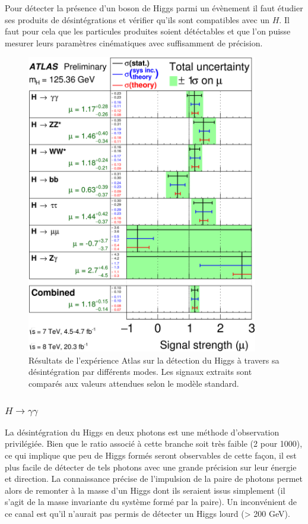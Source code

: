 \documentclass[11pt]{article} %
\begin{document}
Pour détecter la présence d'un boson de Higgs parmi un évènement il faut étudier ses produits de désintégrations et vérifier qu'ils sont compatibles avec un $H$. Il faut pour cela que les particules produites soient détéctables et que l'on puisse mesurer leurs paramètres cinématiques avec suffisamment de précision.

\begin{figure}[H]
\centering
  \caption{Résultats de l'expérience Atlas sur la détection du Higgs à travers sa désintégration par différents modes. Les signaux extraits sont comparés aux valeurs attendues selon le modèle standard. }
 \includegraphics[width=0.9\textwidth]{../images/fig_02.png}
\end{figure}


\subsubsection{$H \to \gamma \gamma$}

La désintégration du Higgs en deux photons est une méthode d'observation privilégiée. Bien que le ratio associé à cette branche soit très faible (2 pour 1000), ce qui implique que peu de Higgs formés seront observables de cette façon, il est plus facile de détecter de tels photons avec une grande précision sur leur énergie et direction. La connaissance précise de l'impulsion de la paire de photons permet alors de remonter à la masse d'un Higgs dont ils seraient issus simplement (il s'agit de la masse invariante du système formé par la paire). Un inconvénient de ce canal est qu'il n'aurait pas permis de détecter un Higgs lourd (> 200 GeV).
\end{document}
